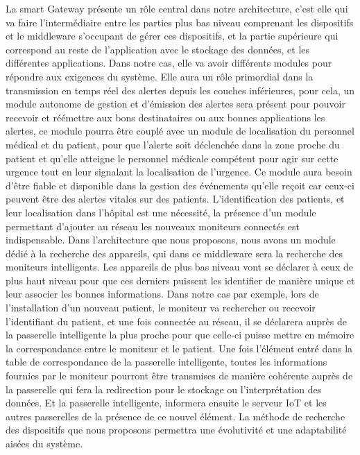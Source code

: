 La smart Gateway présente un rôle central dans notre architecture, c’est elle qui va faire l’intermédiaire entre les parties plus bas niveau comprenant les dispositifs et le middleware s’occupant de gérer ces dispositifs, et la partie supérieure qui correspond au reste de l’application avec le stockage des données, et les différentes applications.
Dans notre cas, elle va avoir différents modules pour répondre aux exigences du système. Elle aura un rôle primordial dans la transmission en temps réel des alertes depuis les couches inférieures, pour cela, un module autonome de gestion et d’émission des alertes sera présent pour pouvoir recevoir et réémettre aux bons destinataires ou aux bonnes applications les alertes, ce module pourra être couplé avec un module de localisation du personnel médical et du patient, pour que l’alerte soit déclenchée dans la zone proche du patient et qu’elle atteigne le personnel médicale compétent pour agir sur cette urgence tout en leur signalant la localisation de l’urgence. Ce module aura besoin d’être fiable et disponible dans la gestion des événements qu’elle reçoit car ceux-ci peuvent être des alertes vitales sur des patients.
L’identification des patients, et leur localisation dans l’hôpital est une nécessité, la présence d’un module permettant d’ajouter au réseau les nouveaux moniteurs connectés est indispensable. Dans l’architecture que nous proposons, nous avons un module dédié à la recherche des appareils, qui dans ce middleware sera la recherche des moniteurs intelligents. Les appareils de plus bas niveau vont se déclarer à ceux de plus haut niveau pour que ces derniers puissent les identifier de manière unique et leur associer les bonnes informations. Dans notre cas par exemple, lors de l’installation d’un nouveau patient, le moniteur va rechercher ou recevoir l’identifiant du patient, et une fois connectée au réseau, il se déclarera auprès de la passerelle intelligente la plus proche pour que celle-ci puisse mettre en mémoire la correspondance entre le moniteur et le patient. Une fois l’élément entré dans la table de correspondance de la passerelle intelligente, toutes les informations fournies par le moniteur pourront être transmises de manière cohérente auprès de la passerelle qui fera la redirection pour le stockage ou l’interprétation des données. Et la passerelle intelligente, informera ensuite le serveur IoT et les autres passerelles de la présence de ce nouvel élément. La méthode de recherche des dispositifs que nous proposons permettra une évolutivité et une adaptabilité aisées du système.
